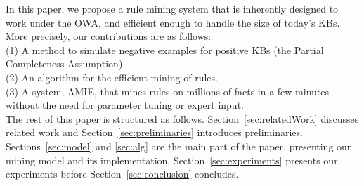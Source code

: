 In this paper, we propose a rule mining system that is inherently designed to work under the OWA, and efficient enough to handle the size of today's KBs. 
More precisely, our contributions are as follows:\\
\noindent (1) A method to simulate negative examples for positive KBs (the Partial Completeness Assumption)\\
\noindent (2) An algorithm for the efficient mining of rules.\\
\noindent (3) A system, AMIE, that mines rules on millions of facts in a few minutes without the need for parameter tuning or expert input.\\
The rest of this paper is structured as follows. Section~\ref{sec:relatedWork} discusses related work and Section~\ref{sec:preliminaries} introduces preliminaries. Sections~\ref{sec:model} and \ref{sec:alg} are the main part of the paper, presenting our mining model and its implementation. Section~\ref{sec:experiments} presents our experiments before Section~\ref{sec:conclusion} concludes.\\[-0.6cm]

